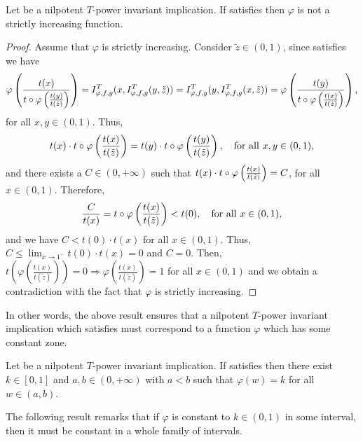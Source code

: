 \begin{lemma}\label{lem:nilpotent:phinonstrict} 
	Let \IT be a nilpotent $T$-power invariant implication. If \IT satisfies \EP then $\varphi$ is not a strictly increasing function.
\end{lemma}
\begin{proof}
	Assume that $\varphi$ is strictly increasing. Consider $\tilde{z} \in (0,1)$, since  \IT satisfies \EP we have
	$$\varphi \left(\frac{t(x)}{t \circ \varphi \left(\frac{t(y)}{t(\tilde{z})}\right)}\right) = I^T_{\varphi,f,g}(x,I^T_{\varphi,f,g}(y,\tilde{z})) = I^T_{\varphi,f,g}(y,I^T_{\varphi,f,g}(x,\tilde{z})) = \varphi \left(\frac{t(y)}{t \circ \varphi \left(\frac{t(x)}{t(\tilde{z})}\right)}\right),$$
	for all $x,y \in (0,1)$. Thus,
	$$t(x)\cdot t\circ \varphi \left(\frac{t(x)}{t(\tilde{z})}\right) = t(y)\cdot t \circ \varphi \left(\frac{t(y)}{t(\tilde{z})}\right), \quad \text{for all } x,y \in (0,1),$$
	and there exists a $C \in (0,+\infty)$ such that $t(x) \cdot t \circ \varphi \left(\frac{t(x)}{t(\tilde{z})}\right)=C$, for all $x \in (0,1)$. Therefore,
	$$\frac{C}{t(x)} = t \circ \varphi \left(\frac{t(x)}{t(\tilde{z})}\right) < t(0), \quad \text{for all } x \in (0,1),$$
	and we have $C < t(0) \cdot t(x)$ for all $x \in (0,1)$. Thus, $\displaystyle C \leq \lim_{x \to 1^-} t(0) \cdot t(x) = 0$ and $C=0$. Then, $t \left(\varphi \left(\frac{t(x)}{t(\tilde{z})}\right)\right) = 0 \Rightarrow \varphi \left(\frac{t(x)}{t(\tilde{z})}\right) =1$ for all $x \in (0,1)$ and we obtain a contradiction with the fact that $\varphi$ is strictly increasing.
\end{proof}
In other words, the above result ensures that a nilpotent $T$-power invariant implication which satisfies \EP must correspond to a function $\varphi$ which has some constant zone.
\begin{corollary}
	Let \IT be a nilpotent $T$-power invariant implication. If \IT satisfies \EP then there exist $k \in [0,1]$ and $a,b \in (0,+\infty)$ with $a<b$ such that $\varphi(w)=k$ for all $w \in (a,b)$.
\end{corollary}

The following result remarks that if $\varphi$ is constant to $k \in (0,1)$ in some interval, then it must be constant in a whole family of intervals.

